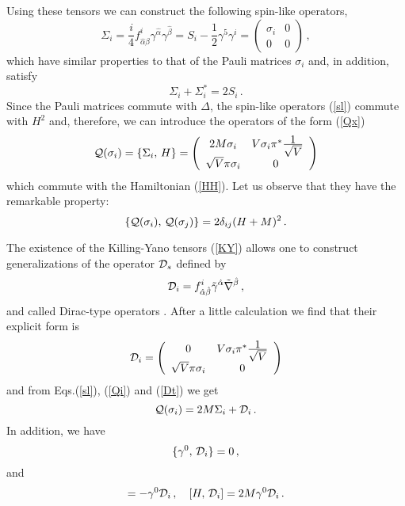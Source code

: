 \documentclass[a4paper,12pt]{article}
\begin{document}
Using these  tensors  we can construct the following spin-like operators,
\begin{equation}\label{sl}
\Sigma_{i}=\frac{i}{4} f^{i}_{\hat\alpha\hat\beta}\gamma^{\hat\alpha}
\gamma^{\hat\beta}=S_{i}-\frac{1}{2}\gamma^{5}\gamma^{i}=
\left( \begin{array}{cc}
\sigma_{i}&0\\
0&0
\end{array}\right) \,,
\end{equation}
which have similar properties to that of the Pauli 
matrices $\sigma_i$ and, in addition, satisfy
\begin{equation}\label{Si}
\Sigma_{i}+\Sigma^{*}_{i}=2S_{i}\,.
\end{equation}
Since the Pauli matrices commute with $\Delta$, the spin-like operators 
(\ref{sl}) commute with $H^2$ and, therefore, we can introduce the 
operators of the form (\ref{Qx})  
\begin{equation}\label{Qi}
{\cal Q}(\sigma_{i})=\{\Sigma_{i},\,H\}=
\left( \begin{array}{cc}
2M\sigma_{i}&V\sigma_{i}\pi^{*}\frac{\textstyle 1}{\textstyle \sqrt{V}}\\
\sqrt{V}\pi\sigma_{i}&0
~\end{array}\right)
\end{equation}
which commute with the Hamiltonian  (\ref{HH}). Let us observe that they 
have the remarkable property:
\begin{equation}\label{QQ}
\{ {\cal Q}(\sigma_{i}),\,{\cal Q}(\sigma_{j})\}=2\delta_{ij}(H+M)^2\,.
\end{equation}  

The existence of the Killing-Yano tensors (\ref{KY}) allows one to 
construct generalizations of the operator ${\cal D}_{s}$ defined by
\begin{equation}
{\cal D}_{i}=f^{i}_{\hat\alpha\hat\beta}\tilde\gamma^{\hat\alpha}\tilde\nabla
^{\hat\beta}\,,
\end{equation}
and called Dirac-type operators \cite{G3}. After a little calculation we find 
that their explicit form is
\begin{equation}\label{Dt}
{\cal D}_{i}=
\left( \begin{array}{cc}
0&V\sigma_{i}\pi^{*}\frac{\textstyle 1}{\textstyle \sqrt{V}}\\
\sqrt{V}\pi\sigma_{i}&0
\end{array}\right)
\end{equation}
and from Eqs.(\ref{sl}), (\ref{Qi}) and (\ref{Dt}) we get
\begin{equation}
{\cal Q}(\sigma_{i})=2M\Sigma_{i}+{\cal D}_{i}\,.
\end{equation}
In addition, we have 
\begin{equation}\label{cocofix}
\{\gamma^{0},\,{\cal D}_{i}\}=0\,,
\end{equation}
and
\begin{equation}
[H,\,\Sigma^{i}]=-\gamma^{0}{\cal D}_{i}\,,\quad
[H,\,{\cal D}_{i}]=2M\gamma^{0}{\cal D}_{i}\,.
\end{equation}
\end{document}

